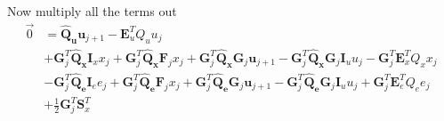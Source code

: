 \documentclass[landscape]{article}
\begin{document}
Now multiply all the terms out
\begin{align}
\vec{0}
& =  \mathbf{\hat{Q}_u} \mathbf{u}_{j+1} -  \mathbf{E}_u^T Q_u u_j\\
& 
+ \mathbf{G}_j^T \mathbf{\hat{Q}_x} \mathbf{I}_x x_j 
+ \mathbf{G}_j^T \mathbf{\hat{Q}_x} \mathbf{F}_j x_j 
+ \mathbf{G}_j^T \mathbf{\hat{Q}_x} \mathbf{G}_j \mathbf{u}_{j+1} 
- \mathbf{G}_j^T \mathbf{\hat{Q}_x} \mathbf{G}_j \mathbf{I}_u u_j  
- \mathbf{G}_j^T \mathbf{E}_x^T Q_x x_j\\
& 
- \mathbf{G}_j^T \mathbf{\hat{Q}_e} \mathbf{I}_e e_j 
+ \mathbf{G}_j^T \mathbf{\hat{Q}_e} \mathbf{F}_j x_j 
+ \mathbf{G}_j^T \mathbf{\hat{Q}_e} \mathbf{G}_j \mathbf{u}_{j+1} 
- \mathbf{G}_j^T \mathbf{\hat{Q}_e} \mathbf{G}_j \mathbf{I}_u u_j 
+ \mathbf{G}_j^T \mathbf{E}_e^T Q_e e_j\\
& + \frac{1}{2} \mathbf{G}_j^T \mathbf{S}_x^T
\end{align}
\end{document}
